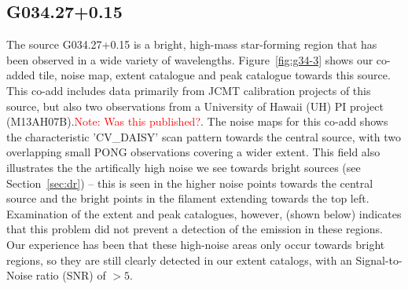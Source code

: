 \documentclass[twocolumn,times]{aastex6}
\newcommand{\note}[1]{\textcolor{red}{Note: #1}}
\begin{document}
\subsection{G034.27+0.15}
The source G034.27+0.15 is a bright, high-mass star-forming region
that has been observed in a wide variety of
wavelengths. Figure~\ref{fig:g34-3} shows our co-added tile, noise map,
extent catalogue and peak catalogue towards this source. This co-add
includes data primarily from JCMT calibration projects of this source,
but also two observations from a University of Hawaii (UH) PI project
(M13AH07B).\note{Was this published?}. The noise maps for this co-add
shows the characteristic 'CV\_DAISY' scan pattern towards the central
source, with two overlapping small PONG observations covering a wider
extent. This field also illustrates the the artifically high noise we
see towards bright sources (see Section~\ref{sec:dr}) -- this is seen
in the higher noise points towards the central source and the bright
points in the filament extending towards the top left. Examination of
the extent and peak catalogues, however, (shown below) indicates that
this problem did not prevent a detection of the emission in these
regions. Our experience has been that these high-noise areas only
occur towards bright regions, so they are still clearly detected in
our extent catalogs, with an Signal-to-Noise ratio (SNR) of $>5$.



\end{document}
